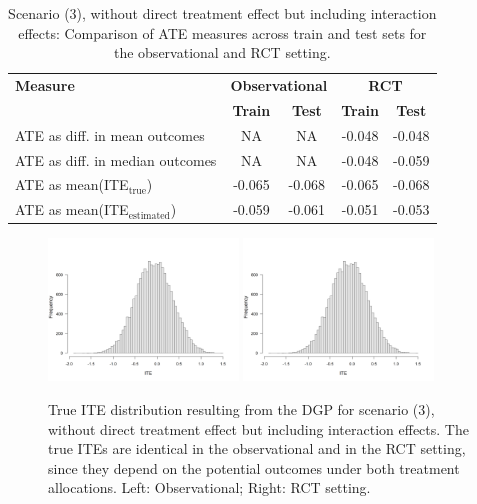 \begin{table}[htbp]
\centering
\caption{Scenario (3), without direct treatment effect but including interaction effects: Comparison of ATE measures across train and test sets for the observational and RCT setting.}
\label{tab:scenario3_ate_comparison}
\begin{tabular}{l c c c c}
\toprule
\textbf{Measure} & \multicolumn{2}{c}{\textbf{Observational}} & \multicolumn{2}{c}{\textbf{RCT}} \\
\cmidrule(lr){2-3} \cmidrule(lr){4-5}
 & \textbf{Train} & \textbf{Test} & \textbf{Train} & \textbf{Test} \\
\midrule
ATE as diff. in mean outcomes & NA & NA & -0.048 & -0.048 \\
ATE as diff. in median outcomes & NA & NA & -0.048 & -0.059 \\
ATE as mean(ITE$_\text{true}$)  & -0.065 & -0.068 & -0.065 & -0.068 \\
ATE as mean(ITE$_\text{estimated}$) & -0.059 & -0.061 & -0.051 & -0.053 \\
\bottomrule
\end{tabular}
\end{table}



\begin{figure}[htbp]
\centering
\includegraphics[width=0.45\textwidth]{img/results/observ_scenario3_ite_distribution_dgp.png}
\includegraphics[width=0.45\textwidth]{img/results/rct_scenario3_ite_distribution_dgp.png}
\caption{True ITE distribution resulting from the DGP for scenario (3), without direct treatment effect but including interaction effects. The true ITEs are identical in the observational and in the RCT setting, since they depend on the potential outcomes under both treatment allocations. Left: Observational; Right: RCT setting.}
\label{fig:scenario3_ite_distribution_dgp}
\end{figure}



